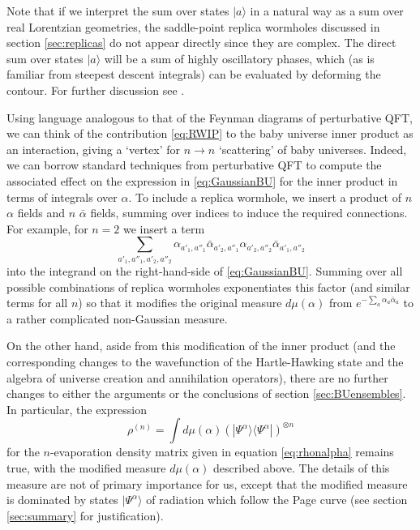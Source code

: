 \documentclass[letterpaper,12pt]{article}
\begin{document}
Note that if we interpret the sum over states $|a\rangle$ in a natural way as a sum over real Lorentzian geometries, the saddle-point replica wormholes discussed in section \ref{sec:replicas} do not appear directly since they are complex. The direct sum over states $|a\rangle$ will be a sum of highly oscillatory phases, which (as is familiar from steepest descent integrals) can be evaluated by deforming the contour. For further discussion see \cite{CDMRW}.

Using language analogous to that of the Feynman diagrams of perturbative QFT,
we can think of the contribution \eqref{eq:RWIP} to the baby universe inner product as an interaction, giving a `vertex' for $n\longrightarrow n$ `scattering' of baby universes.  Indeed, we can borrow standard techniques from perturbative QFT to compute the associated effect on the expression
in \eqref{eq:GaussianBU} for the inner product in terms of integrals over $\alpha$. To include a replica wormhole, we insert a product of $n$ $\alpha$ fields and $n$ $\bar{\alpha}$ fields, summing over indices to induce the required connections. For example, for $n=2$ we insert a term
\begin{equation}
	\sum_{a'_1,a''_1,a'_2,a''_2} \alpha_{a'_1,a''_1}\bar{\alpha}_{a'_2,a''_1} \alpha_{a'_2,a''_2}\bar{\alpha}_{a'_1,a''_2}
\end{equation}
into the integrand on the right-hand-side of \eqref{eq:GaussianBU}. Summing over all possible combinations of replica wormholes exponentiates this factor (and similar terms for all $n$) so that it modifies the original measure $d\mu(\alpha)$ from $e^{-\sum_a\alpha_a\bar{\alpha}_a}$ to a rather complicated non-Gaussian measure.

On the other hand, aside from this modification of the inner product (and the corresponding changes to the wavefunction of the Hartle-Hawking state and the algebra of universe creation and annihilation operators), there are no further changes to either the arguments or the conclusions of section \ref{sec:BUensembles}. In particular, the expression
\begin{equation}
	\rho^{(n)} = \int d\mu(\alpha) \left(|\Psi^\alpha\rangle \langle \Psi^\alpha|\right)^{\otimes n}
\end{equation}
for the $n$-evaporation density matrix given in equation \eqref{eq:rhonalpha} remains true, with the modified measure $d\mu(\alpha)$ described above.  The details of this measure are not of primary importance for us, except that the modified measure is dominated by states $|\Psi^\alpha\rangle$ of radiation which follow the Page curve (see section \ref{sec:summary} for justification).
\end{document}
